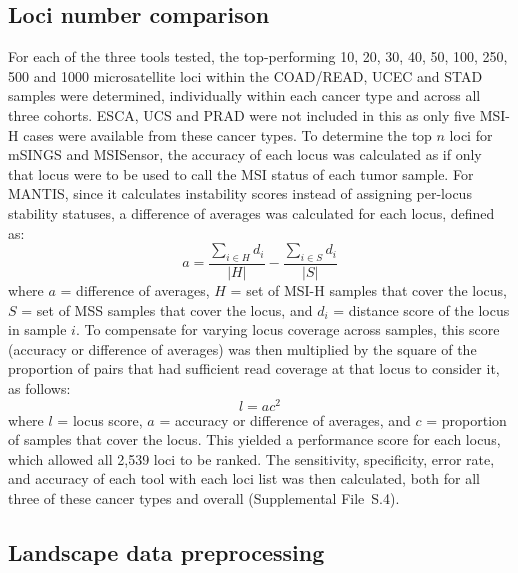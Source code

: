 \subsection{Loci number comparison}
\label{ssec:msilandscape:loci_number_comparison}
For each of the three tools tested, the top-performing 10, 20, 30, 40, 50, 100, 250, 500 and 1000 microsatellite loci within the COAD/READ, UCEC and STAD samples were determined, individually within each cancer type and across all three cohorts. ESCA, UCS and PRAD were not included in this as only five MSI-H cases were available from these cancer types. To determine the top $n$ loci for mSINGS and MSISensor, the accuracy of each locus was calculated as if only that locus were to be used to call the MSI status of each tumor sample. For MANTIS, since it calculates instability scores instead of assigning per-locus stability statuses, a difference of averages was calculated for each locus, defined as:
\begin{equation}
	a = \frac{\sum_{i \in H} d_i}{\left|H\right|} - \frac{\sum_{i \in S} d_i}{\left|S\right|}
\end{equation}
where $a$ = difference of averages, $H$ = set of MSI-H samples that cover the locus, $S$ = set of MSS samples that cover the locus, and $d_i$ = distance score of the locus in sample $i$. To compensate for varying locus coverage across samples, this score (accuracy or difference of averages) was then multiplied by the square of the proportion of pairs that had sufficient read coverage at that locus to consider it, as follows:
\begin{equation}
	l = ac^2
\end{equation}
where $l$ = locus score, $a$ = accuracy or difference of averages, and $c$ = proportion of samples that cover the locus. This yielded a performance score for each locus, which allowed all 2,539 loci to be ranked. The sensitivity, specificity, error rate, and accuracy of each tool with each loci list was then calculated, both for all three of these cancer types and overall (Supplemental File~S\thechapter{}.4).

\subsection{Landscape data preprocessing}
